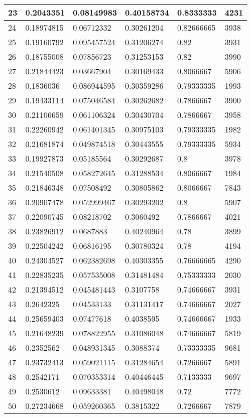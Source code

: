 \begin{longtable}{|l|l|l|l|l|l|}
23 & 0.2043351 & 0.08149983 & 0.40158734 & 0.8333333 & 4231 \\ \hline 
24 & 0.18974815 & 0.06712332 & 0.30261204 & 0.82666665 & 3938 \\ \hline 
25 & 0.19160792 & 0.095457524 & 0.31206274 & 0.82 & 3931 \\ \hline 
26 & 0.18755008 & 0.07856723 & 0.31253153 & 0.82 & 3990 \\ \hline 
27 & 0.21844423 & 0.03667904 & 0.30169433 & 0.8066667 & 5906 \\ \hline 
28 & 0.1836036 & 0.086944595 & 0.30359286 & 0.79333335 & 1993 \\ \hline 
29 & 0.19433114 & 0.075046584 & 0.30262682 & 0.7866667 & 3900 \\ \hline 
30 & 0.21106659 & 0.061106324 & 0.30430704 & 0.7866667 & 3958 \\ \hline 
31 & 0.22260942 & 0.061401345 & 0.30975103 & 0.79333335 & 1982 \\ \hline 
32 & 0.21681874 & 0.049874518 & 0.30443555 & 0.79333335 & 5934 \\ \hline 
33 & 0.19927873 & 0.05185564 & 0.30292687 & 0.8 & 3978 \\ \hline 
34 & 0.21540508 & 0.058272645 & 0.31288534 & 0.8066667 & 1984 \\ \hline 
35 & 0.21846348 & 0.07508492 & 0.30805862 & 0.8066667 & 7843 \\ \hline 
36 & 0.20907478 & 0.052999467 & 0.30293202 & 0.8 & 5907 \\ \hline 
37 & 0.22090745 & 0.08218702 & 0.3060492 & 0.7866667 & 4021 \\ \hline 
38 & 0.23826912 & 0.0687883 & 0.40240964 & 0.78 & 3899 \\ \hline 
39 & 0.22504242 & 0.06816195 & 0.30780324 & 0.78 & 4194 \\ \hline 
40 & 0.24304527 & 0.062382698 & 0.40303355 & 0.76666665 & 4290 \\ \hline 
41 & 0.22835235 & 0.057535008 & 0.31481484 & 0.75333333 & 2030 \\ \hline 
42 & 0.21394512 & 0.045481443 & 0.3107758 & 0.74666667 & 3931 \\ \hline 
43 & 0.2642325 & 0.04533133 & 0.31131417 & 0.74666667 & 2027 \\ \hline 
44 & 0.25659403 & 0.07477618 & 0.4038595 & 0.74666667 & 1933 \\ \hline 
45 & 0.21648239 & 0.078822955 & 0.31086048 & 0.74666667 & 5819 \\ \hline 
46 & 0.2352562 & 0.048931345 & 0.3088374 & 0.73333335 & 9681 \\ \hline 
47 & 0.23732413 & 0.059021115 & 0.31284654 & 0.7266667 & 5891 \\ \hline 
48 & 0.2542171 & 0.070353314 & 0.40446445 & 0.7133333 & 9697 \\ \hline 
49 & 0.2530612 & 0.09633381 & 0.40498048 & 0.72 & 7772 \\ \hline 
50 & 0.27234668 & 0.059260365 & 0.3815322 & 0.7266667 & 7879 \\ \hline 
\end{longtable}